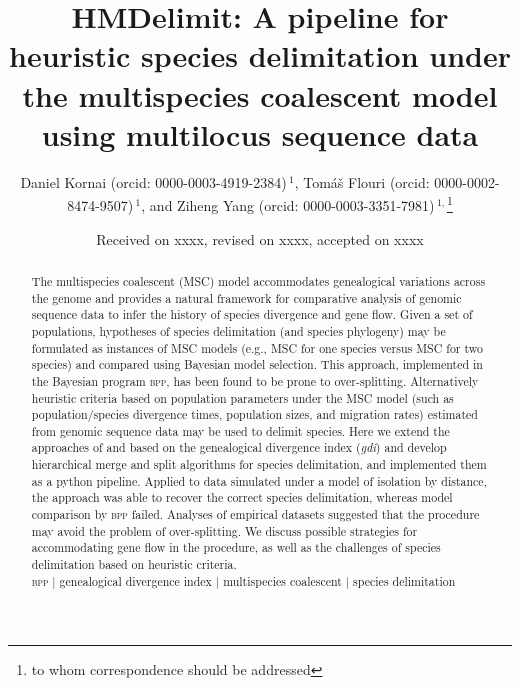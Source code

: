 \documentclass[A4]{article1}
\begin{document}
\title[Heuristic species delimitation] {HMDelimit: A pipeline for heuristic species delimitation
   under the multispecies coalescent model using multilocus sequence data}

\author[
	Kornai \textit{et~al.}]{Daniel Kornai (orcid: 0000-0003-4919-2384)\,$^{1}$, 
	Tom\'{a}\v{s} Flouri (orcid: 0000-0002-8474-9507)\,$^{1}$, and
	Ziheng Yang (orcid: 0000-0003-3351-7981)\,$^{1,}$\footnote{to whom correspondence should be addressed}}

\address{
	$^1$Department of Genetics, Evolution and Environment, University College London, UK \\
}

\date{Received on xxxx, revised on xxxx, accepted on xxxx}


\begin{abstract}
The multispecies coalescent (MSC) model accommodates genealogical variations across
the genome and provides a natural framework for comparative analysis of genomic
sequence data to infer the history of species divergence and gene flow.  Given a set
of populations, hypotheses of species delimitation (and species phylogeny) may be
formulated as instances of MSC models (e.g., MSC for one species versus MSC for two
species) and compared using Bayesian model selection. This approach, implemented in
the Bayesian program \textsc{bpp}, has been found to be prone to over-splitting.
Alternatively heuristic criteria based on population parameters under the MSC model
(such as population/species divergence times, population sizes, and migration rates)
estimated from genomic sequence data may be used to delimit species.  Here we extend
the approaches of \cite{Jackson2017} and \cite{Leache2019} based on the genealogical
divergence index (\textit{gdi}) and develop hierarchical merge and split algorithms
for species delimitation, and implemented them as a python pipeline.  Applied to
data simulated under a model of isolation by distance, the approach was able to
recover the correct species delimitation, whereas model comparison by \textsc{bpp}
failed.  Analyses of empirical datasets suggested that the procedure may avoid the
problem of over-splitting.  We discuss possible strategies for accommodating gene
flow in the procedure, as well as the challenges of species delimitation based on
heuristic criteria. \\ %
\textsc{bpp} $|$ genealogical divergence index $|$ multispecies coalescent $|$
species delimitation
\end{abstract}
\end{document}
